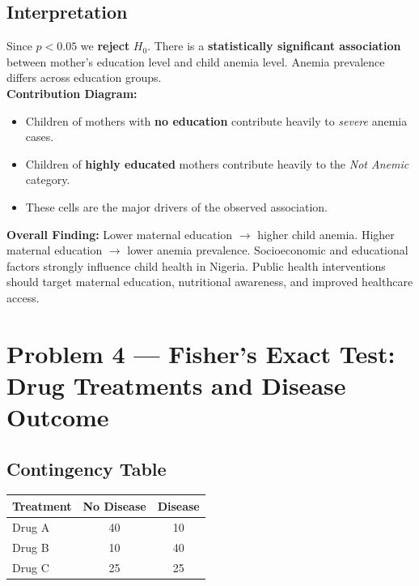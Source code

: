 \documentclass[12pt,a4paper]{article}
\begin{document}
\subsection{Interpretation}

\begin{interpbox}
Since $p < 0.05$ we \textbf{reject} $H_0$. There is a \textbf{statistically significant association} between mother's education level and child anemia level. Anemia prevalence differs across education groups.\\[4pt]
\textbf{Contribution Diagram:}
\begin{itemize}[noitemsep]
  \item Children of mothers with \textbf{no education} contribute heavily to \textit{severe} anemia cases.
  \item Children of \textbf{highly educated} mothers contribute heavily to the \textit{Not Anemic} category.
  \item These cells are the major drivers of the observed association.
\end{itemize}
\textbf{Overall Finding:} Lower maternal education $\rightarrow$ higher child anemia. Higher maternal education $\rightarrow$ lower anemia prevalence. Socioeconomic and educational factors strongly influence child health in Nigeria. Public health interventions should target maternal education, nutritional awareness, and improved healthcare access.
\end{interpbox}

\newpage
\section{Problem 4 — Fisher's Exact Test: Drug Treatments and Disease Outcome}

\subsection{Contingency Table}

\begin{center}
\begin{tabular}{lcc}
\toprule
Treatment & No Disease & Disease \\
\midrule
Drug A & 40 & 10 \\
Drug B & 10 & 40 \\
Drug C & 25 & 25 \\
\bottomrule
\end{tabular}
\end{center}
\end{document}
